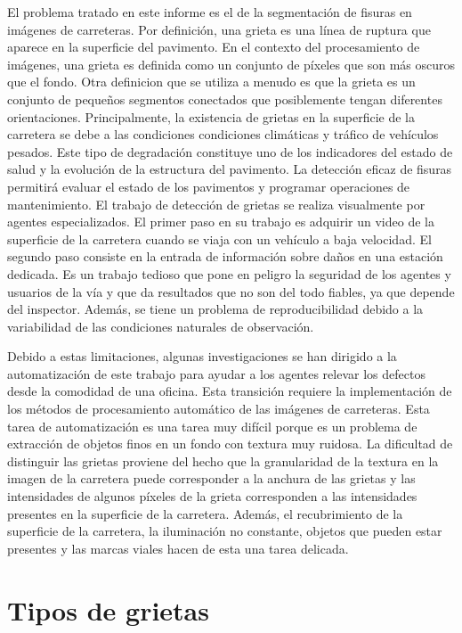 \documentclass[11pt,a4paper]{article}
\begin{document}
El problema tratado en este informe es el de la segmentación de fisuras en imágenes de carreteras. Por definición, una grieta es una línea de ruptura que aparece en la superficie del pavimento. En el contexto del procesamiento de imágenes, una grieta es definida como un conjunto de píxeles que son más oscuros que el fondo. Otra definicion que se utiliza a menudo es que la grieta es un conjunto de pequeños segmentos conectados que posiblemente tengan diferentes orientaciones.
Principalmente, la existencia de grietas en la superficie de la carretera se debe a las condiciones condiciones climáticas y tráfico de vehículos pesados. Este tipo de degradación constituye uno de los indicadores del estado de salud y la evolución de la estructura del pavimento. 
La detección eficaz de fisuras permitirá evaluar el estado de los pavimentos y programar operaciones de mantenimiento. 
El trabajo de detección de grietas se realiza visualmente por agentes especializados. 
El primer paso en su trabajo es adquirir un video de la superficie de la carretera cuando se viaja con un vehículo a baja velocidad. 
El segundo paso consiste en la entrada de información sobre daños en una estación dedicada. 
Es un trabajo tedioso que pone en peligro la seguridad de los agentes y usuarios de la vía y que da resultados que no son del todo fiables, ya que depende del inspector. Además, se tiene un problema de reproducibilidad debido a la variabilidad de las condiciones naturales de observación.

Debido a estas limitaciones, algunas investigaciones se han dirigido a la automatización de este trabajo para ayudar a los agentes relevar los defectos desde la comodidad de una oficina. Esta transición requiere la implementación de los métodos de procesamiento automático de las imágenes de carreteras.
Esta tarea de automatización es una tarea muy difícil porque es un problema de extracción de objetos finos en un fondo con textura muy ruidosa. La dificultad de distinguir las grietas proviene del hecho que la granularidad de la textura en la imagen de la carretera puede corresponder a la anchura de las grietas y las intensidades de algunos píxeles de la grieta corresponden a las intensidades presentes en la superficie de la carretera. 
Además, el recubrimiento de la superficie de la carretera, la iluminación no constante, objetos que pueden estar presentes y las marcas viales hacen de esta una tarea delicada.


\section{Tipos de grietas}
\end{document}
